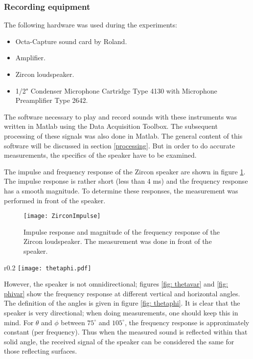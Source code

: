 \subsubsection{Recording equipment}
The following hardware was used during the experiments:
\vspace{-20pt}
\begin{itemize}
	\setlength{\itemsep}{1pt}
  \setlength{\parskip}{0pt}
  \setlength{\parsep}{0pt}
	\item Octa-Capture sound card by Roland.
	\item Amplifier.
	\item Zircon loudspeaker.
	\item 1/2" Condenser Microphone Cartridge Type 4130 with Microphone Preamplifier Type 2642.
\end{itemize}

The software necessary to play and record sounds with these instruments was written in Matlab using the Data Acquisition Toolbox. The subsequent processing of these signals was also done in Matlab. The general content of this software will be discussed in section \ref{processing}. But in order to do accurate measurements, the specifics of the speaker have to be examined.

The impulse and frequency response of the Zircon speaker are shown in figure \ref{fig: ZirconImp}. The impulse response is rather short (less than 4 ms) and the frequency response has a smooth magnitude. To determine these responses, the measurement was performed in front of the speaker.
\begin{figure}[h!]
  \centering
    \texttt{[image: ZirconImpulse]}
  \caption{Impulse response and magnitude of the frequency response of the Zircon loudspeaker. The measurement was done in front of the speaker. }
  \label{fig: ZirconImp}
\end{figure}



\begin{wrapfigure}{r}{0.2\textwidth}
	\vspace{-20pt}
  \centering
    \texttt{[image: thetaphi.pdf]}
  \caption{Definition of angles $\theta$ and $\phi$.}
  \label{fig: thetaphi}
  \vspace{-40pt}
\end{wrapfigure}
However, the speaker is not omnidirectional; figures \ref{fig: thetavar} and \ref{fig: phivar} show the frequency response at different vertical and horizontal angles. The definition of the angles is given in figure \ref{fig: thetaphi}. 
It is clear that the speaker is very directional; when doing measurements, one should keep this in mind. For $\theta$ and $\phi$ between $75^{\circ}$ and $105^{\circ}$, the frequency response is approximately constant (per frequency). Thus when the measured sound is reflected within that solid angle, the received signal of the speaker can be considered the same for those reflecting surfaces.

